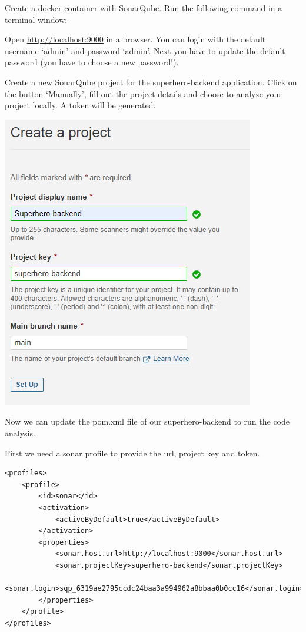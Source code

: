 \begin{oefening}

Create a docker container with SonarQube. Run the following command in a terminal window:


Open \url{http://localhost:9000} in a browser. You can login with the default username `admin' and password `admin'. Next you have to update the default password (you have to choose a new password!).

\vspace{5mm}

Create a new SonarQube project for the superhero-backend application. Click on the button `Manually', fill out the project details and choose to analyze your project locally. A token will be generated.

\includegraphics{./images/chapter3/sonarqube_create_project.png}

Now we can update the pom.xml file of our superhero-backend to run the code analysis.

First we need a sonar profile to provide the url, project key and token.

\begin{lstlisting}
<profiles>
	<profile>
		<id>sonar</id>
		<activation>
			<activeByDefault>true</activeByDefault>
		</activation>
		<properties>
			<sonar.host.url>http://localhost:9000</sonar.host.url>
			<sonar.projectKey>superhero-backend</sonar.projectKey>
			<sonar.login>sqp_6319ae2795ccdc24baa3a994962a8bbaa0b0cc16</sonar.login>
		</properties>
	</profile>
</profiles>
\end{lstlisting}


\end{oefening}
